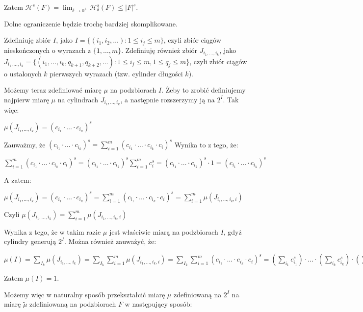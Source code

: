 \documentclass{mini}
\begin{document}
\begin{dow}
Zatem $\mathcal{H}^s(F)=\lim_{\delta\rightarrow 0^+}\mathcal{H}^s_{\delta}(F)\leqslant|F|^s$.

Dolne ograniczenie będzie trochę bardziej skomplikowane.

Zdefiniuję zbiór $I$, jako $ I = \lbrace (i_1 , i_2 , \ldots ): 1 \leqslant i_j \leqslant m \rbrace $, czyli zbiór ciągów nieskończonych o wyrazach z $ \lbrace 1 , \ldots , m \rbrace $. Zdefiniuję również zbiór $J_{i_1 , \ldots , i_k}$, jako $ J_{i_1 , \ldots , i_k} = \lbrace (i_1 , \ldots , i_k , q_{k+1} , q_{k+2} , \ldots ): 1 \leqslant i_j \leqslant m , 1 \leqslant q_j \leqslant m \rbrace $, czyli zbiór ciągów o ustalonych $k$ pierwszych wyrazach (tzw. cylinder długości $k$).

Możemy teraz zdefiniować miarę $\mu$ na podzbiorach $I$. Żeby to zrobić definiujemy najpierw miarę $\mu$ na cylindrach $J_{i_1, \ldots , i_k}$, a następnie rozszerzymy ją na $2^I$. Tak więc:

$ \mu ( J_{i_1, \ldots , i_k} ) = (c_{i_1} \cdot \ldots \cdot c_{i_k})^s $

Zauważmy, że $ (c_{i_1} \cdot \ldots \cdot c_{i_k})^s = \sum^m_{i=1} (c_{i_1} \cdot \ldots \cdot c_{i_k} \cdot c_i)^s $ Wynika to z tego, że:

$ \sum^m_{i=1} (c_{i_1} \cdot \ldots \cdot c_{i_k} \cdot c_i)^s = (c_{i_1} \cdot \ldots \cdot c_{i_k})^s \sum^m_{i=1} c_i^s = (c_{i_1} \cdot \ldots \cdot c_{i_k})^s \cdot 1 = (c_{i_1} \cdot \ldots \cdot c_{i_k})^s $

A zatem:

$ \mu ( J_{i_1, \ldots , i_k} ) = (c_{i_1} \cdot \ldots \cdot c_{i_k})^s = \sum^m_{i=1} (c_{i_1} \cdot \ldots \cdot c_{i_k} \cdot c_i)^s = \sum^m_{i=1} \mu (J_{i_1, \ldots , i_k,i}) $

Czyli $ \mu ( J_{i_1, \ldots , i_k} ) = \sum^m_{i=1} \mu (J_{i_1, \ldots , i_k,i}) $

Wynika z tego, że w takim razie $\mu$ jest właściwie miarą na podzbiorach $I$, gdyż cylindry generują $2^I$. Można również zauważyć, że:

$ \mu (I) = \sum_{I_k} \mu ( J_{i_1, \ldots , i_k} ) = \sum_{I_k} \sum^m_{i=1} \mu (J_{i_1, \ldots , i_k,i}) = \sum_{I_k} \sum^m_{i=1} (c_{i_1} \cdot \ldots \cdot c_{i_k} \cdot c_i)^s = ( \sum_{i_1} c_{i_1}^s ) \cdot \ldots \cdot ( \sum_{i_k} c_{i_k}^s ) \cdot ( \sum^{m}_{i=1} c_{i}^s ) = 1 \cdot \ldots \cdot 1 = 1 $

Zatem $ \mu ( I ) = 1 $.

Możemy więc w naturalny sposób przekształcić miarę $\mu$ zdefiniowaną na $2^I$ na miarę $ \tilde{\mu} $ zdefiniowaną na podzbiorach $F$ w następujący sposób:


\end{dow}
\end{document}
